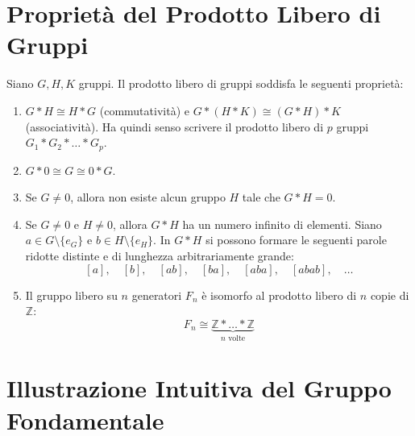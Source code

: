 \vspace{1.5em}
\section{Proprietà del Prodotto Libero di Gruppi}

\begin{prop}
Siano $G, H, K$ gruppi. Il prodotto libero di gruppi soddisfa le seguenti proprietà:
\begin{enumerate}
    \item $G * H \cong H * G$ (commutatività) e $G * (H * K) \cong (G * H) * K$ (associatività).
    Ha quindi senso scrivere il prodotto libero di $p$ gruppi $G_1 * G_2 * \dots * G_p$.
    \item $G * 0 \cong G \cong 0 * G$.
    \item Se $G \neq 0$, allora non esiste alcun gruppo $H$ tale che $G * H = 0$.
    \item Se $G \neq 0$ e $H \neq 0$, allora $G * H$ ha un numero infinito di elementi.
    Siano $a \in G \setminus \{e_G\}$ e $b \in H \setminus \{e_H\}$. In $G * H$ si possono formare le seguenti parole ridotte distinte e di lunghezza arbitrariamente grande:
    \[
    [a], \quad [b], \quad [ab], \quad [ba], \quad [aba], \quad [abab], \quad \dots
    \]
    \item Il gruppo libero su $n$ generatori $F_n$ è isomorfo al prodotto libero di $n$ copie di $\mathbb{Z}$:
    \[
    F_n \cong \underbrace{\mathbb{Z} * \dots * \mathbb{Z}}_{n \text{ volte}}
    \]
\end{enumerate}
\end{prop}

\vspace{1.5em}


\section{Illustrazione Intuitiva del Gruppo Fondamentale}

